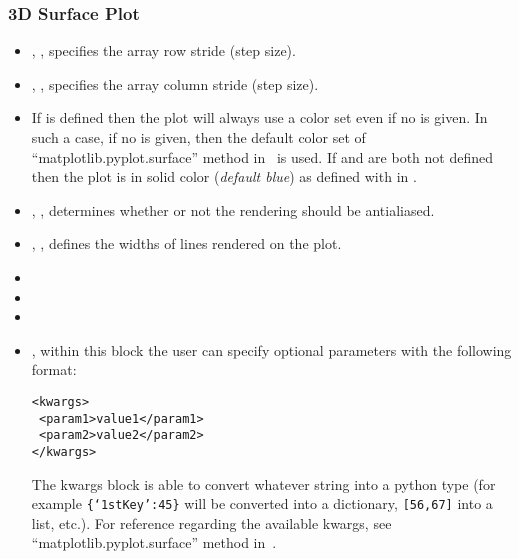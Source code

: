 \subsubsection{3D Surface Plot}
\begin{itemize}
  \item {}, , specifies the
  array row stride (step size).
  \item {}, , specifies the
  array column stride (step size).
  \item {}
   \nb If  is defined then the plot will always use a color set even if no  is given.
  In such a case, if no  is given, then the default color set of  ``matplotlib.pyplot.surface'' method in~\cite{MatPlotLib} is used.
  If  and  are both not defined then the plot is in solid color (\textit{default blue}) as defined with  in .
  \item {}, , determines
  whether or not the rendering should be antialiased.
  \item {}, , defines the
  widths of lines rendered on the plot.
  \item {}
  \item {}
  \item {}
  \item {}, within this block the user can specify optional
  parameters with the following format:

\begin{lstlisting}[style=XML]
<kwargs>
 <param1>value1</param1>
 <param2>value2</param2>
</kwargs>
\end{lstlisting}

  The kwargs block is able to convert whatever string into a python type (for
  example  \texttt{\{`1stKey':45\}} will
  be converted into a dictionary,
   \texttt{[56,67]}  into a list, etc.).
  For reference regarding the available kwargs, see
  ``matplotlib.pyplot.surface'' method in~\cite{MatPlotLib}.
\end{itemize}

